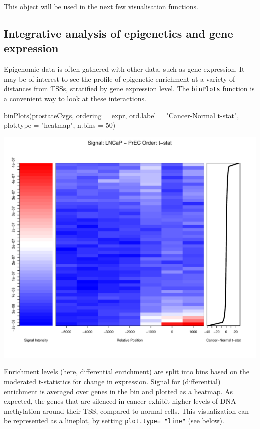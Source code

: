 This object will be used in the next few visualisation functions.

\subsection{Integrative analysis of epigenetics and gene expression}
\noindent Epigenomic data is often gathered with other data, such as gene expression. It may be of interest to see the profile of epigenetic enrichment at a variety of distances from TSSs, stratified by gene expression level. The \texttt{binPlots} function is a convenient way to look at these interactions.

\begin{Schunk}
\begin{Sinput}
 binPlots(prostateCvgs, ordering = expr, ord.label = "Cancer-Normal t-stat",
          plot.type = "heatmap", n.bins = 50)
\end{Sinput}
\end{Schunk}
\includegraphics{visualisations-binPlotsHeatmap}

\noindent Enrichment levels (here, differential enrichment) are split into bins based on the moderated t-statistics for change in expression.  Signal for (differential) enrichment is averaged over genes in the bin and plotted as a heatmap.  As expected, the genes that are silenced in cancer exhibit higher levels of DNA methylation around their TSS, compared to normal cells.  This visualization can be represented as a lineplot, by setting \texttt{plot.type= "line"} (see below). \\

